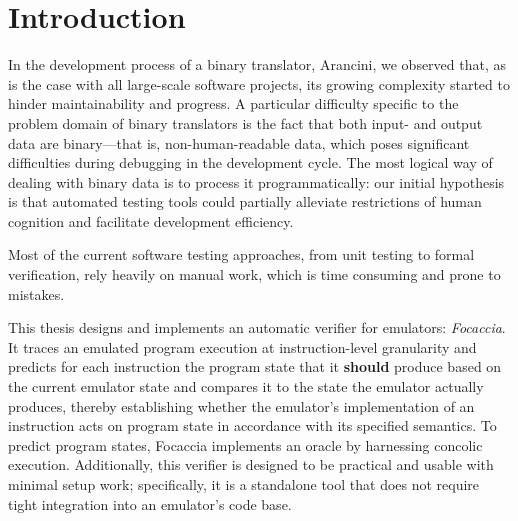 
\chapter{Introduction}\label{chapter:introduction}

In the development process of a binary translator, Arancini, we observed that, as is the case with all large-scale
software projects, its growing complexity started to hinder maintainability and progress. A particular difficulty
specific to the problem domain of binary translators is the fact that both input- and output data are binary---that is,
non-human-readable data, which poses significant difficulties during debugging in the development cycle. The most
logical way of dealing with binary data is to process it programmatically: our initial hypothesis is that automated
testing tools could partially alleviate restrictions of human cognition and facilitate development efficiency.

Most of the current software testing approaches, from unit testing to formal verification, rely heavily on manual work,
which is time consuming and prone to mistakes.

This thesis designs and implements an automatic verifier for emulators: \textit{Focaccia}. It traces an emulated program
execution at instruction-level granularity and predicts for each instruction the program state that it \textbf{should}
produce based on the current emulator state and compares it to the state the emulator actually produces, thereby
establishing whether the emulator's implementation of an instruction acts on program state in accordance with its
specified semantics. To predict program states, Focaccia implements an oracle by harnessing concolic execution.
Additionally, this verifier is designed to be practical and usable with minimal setup work; specifically, it is a
standalone tool that does not require tight integration into an emulator's code base.
